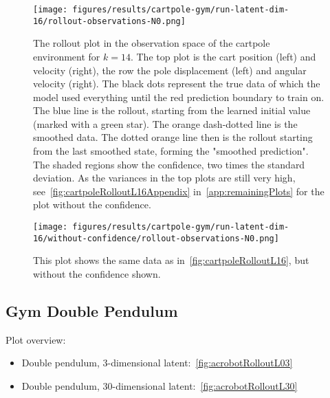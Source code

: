 		\begin{figure}
			\centering
			\texttt{[image: figures/results/cartpole-gym/run-latent-dim-16/rollout-observations-N0.png]}
			\caption[Rollout of the cartpole experiment for 14 latent dimensions with confidence]{The rollout plot in the observation space of the cartpole environment for \(k = 14\). The top plot is the cart position (left) and velocity (right), the row the pole displacement (left) and angular velocity (right). The black dots represent the true data of which the model used everything until the red prediction boundary to train on. The blue line is the rollout, starting from the learned initial value (marked with a green star). The orange dash-dotted line is the smoothed data. The dotted orange line then is the rollout starting from the last smoothed state, forming the "smoothed prediction". The shaded regions show the confidence, \ie two times the standard deviation. As the variances in the top plots are still very high, see~\autoref{fig:cartpoleRolloutL16Appendix} in~\autoref{app:remainingPlots} for the plot without the confidence.}
			\label{fig:cartpoleRolloutL16}
		\end{figure}
		\begin{figure}
			\centering
			\texttt{[image: figures/results/cartpole-gym/run-latent-dim-16/without-confidence/rollout-observations-N0.png]}
			\caption[Rollout of the cartpole experiment for 14 latent dimensions without confidence]{This plot shows the same data as in~\autoref{fig:cartpoleRolloutL16}, but without the confidence shown.}
			\label{fig:cartpoleRolloutL16Appendix}
		\end{figure}

	\subsection{Gym Double Pendulum}
		Plot overview:
		\begin{itemize}
			\item Double pendulum, 3-dimensional latent:~\autoref{fig:acrobotRolloutL03}
			\item Double pendulum, 30-dimensional latent:~\autoref{fig:acrobotRolloutL30}
		\end{itemize}

